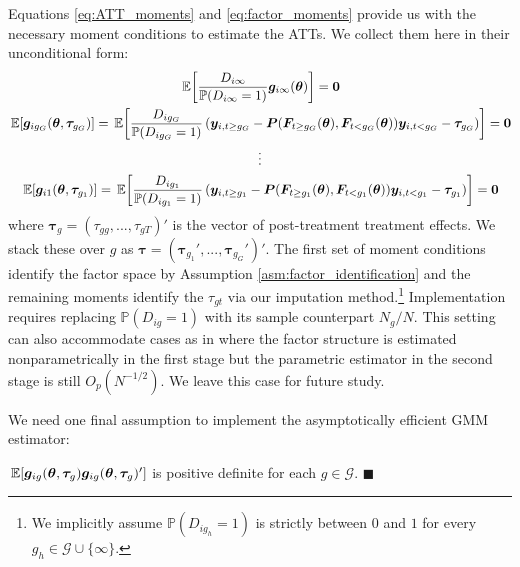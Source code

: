 Equations \eqref{eq:ATT_moments} and \eqref{eq:factor_moments} provide us with the necessary moment conditions to estimate the ATTs. We collect them here in their unconditional form: 
\begin{gather*}
  \expec{\frac{D_{i\infty}}{\mathbb{P}(D_{i \infty} = 1)}\bm g_{i \infty}(\bm{\theta})} = \bm 0\\
  \expec{\bm g_{i g_G}(\bm{\theta}, \bm \tau_{g_G})} = \expec{ \frac{D_{ig_G}}{\mathbb{P}(D_{ig_G} = 1) } \left( \bm y_{i, t \geq g_G} - \bm P(\bm{F}_{t \geq g_G}(\bm{\theta}), \bm{F}_{t < g_G}(\bm{\theta})) \bm y_{i, t < g_G} - \bm \tau_{g_G} \right)} = \bm 0\\
  \vdots\\
  \expec{\bm g_{i 1}(\bm{\theta}, \bm \tau_{g_1})} = \expec{ \frac{D_{i g_1}}{\mathbb{P}(D_{i g_1} = 1) } \left( \bm y_{i, t \geq g_1} - \bm P(\bm{F}_{t \geq g_1}(\bm{\theta}), \bm{F}_{t < g_1}(\bm{\theta})) \bm y_{i, t < g_1} - \bm \tau_{g_1} \right)} = \bm 0
\end{gather*}
where $\bm \tau_g = (\tau_{gg},...,\tau_{gT})'$ is the vector of post-treatment treatment effects. We stack these over $g$ as $\bm \tau = (\bm \tau_{g_1}',...,\bm \tau_{g_G}')'$. The first set of moment conditions identify the factor space by Assumption \ref{asm:factor_identification} and the remaining moments identify the $\tau_{gt}$ via our imputation method.\footnote{We implicitly assume $\mathbb{P}(D_{ig_h} = 1)$ is strictly between $0$ and $1$ for every $g_h \in \mathcal{G} \cup \{\infty\}$.} Implementation requires replacing $\mathbb{P}(D_{ig} = 1)$ with its sample counterpart $N_g/N$. This setting can also accommodate cases as in \citet{Hahn_Liao_Geert_2018} where the factor structure is estimated nonparametrically in the first stage but the parametric estimator in the second stage is still $O_p(N^{-1/2})$. We leave this case for future study.


We need one final assumption to implement the asymptotically efficient GMM estimator:
\begin{assumption}\label{asm:variance_pd}
  $\expec{\bm g_{ig}(\bm{\theta}, \bm \tau_g) \bm g_{ig}(\bm{\theta}, \bm \tau_g)'}$ is positive definite for each $g \in \mathcal{G}$. $\blacksquare$
\end{assumption}

